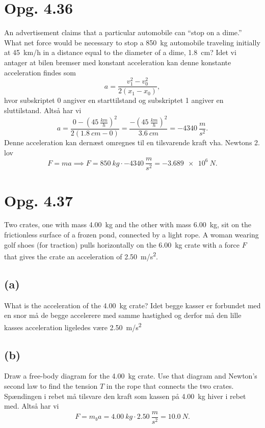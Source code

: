 \documentclass[12pt]{article}
\begin{document}
\section*{Opg. 4.36}
An advertisement claims that a particular automobile can ``stop on a dime.'' What net force would be necessary to stop a \qty{850}{kg} automobile traveling initially at \qty{45}{km/h} in a distance equal to the diameter of a dime, \qty{1,8}{cm}?
\bigbreak
Idet vi antager at bilen bremser med konstant acceleration kan denne konstante acceleration findes som
\[
a = \frac{v_1^2-v_0^2}{2\left( x_1 - x_0 \right)}
,\] 
hvor subskriptet 0 angiver en starttilstand og subskriptet 1 angiver en sluttilstand. Altså har vi
\[
a = \frac{0-(\qty{45}{\frac{km}{h}})^2}{2\left( \qty{1,8}{cm}-0 \right) } = \frac{-(\qty{45}{\frac{km}{h}})^2}{\qty{3,6}{cm}} = \qty{-4340}{\frac{m}{s^2}}
.\] 
Denne acceleration kan dernæst omregnes til en tilsvarende kraft vha. Newtons 2. lov
\[
F = ma \implies F = \qty{850}{kg}\cdot \qty{-4340}{\frac{m}{s^2}} = \qty{-3,689e6}{N}
.\] 

\section*{Opg. 4.37}
Two crates, one with mass \qty{4,00}{kg} and the other with mass \qty{6,00}{\kg}, sit on the frictionless surface of a frozen pond, connected by a light rope. A woman wearing golf shoes (for traction) pulls horizontally on the \qty{6,00}{\kg} crate with a force $F$ that gives the crate an acceleration of \qty{2,50}{m/s^2}.


\subsection*{(a)}
What is the acceleration of the \qty{4,00}{kg} crate?
\bigbreak
Idet begge kasser er forbundet med en snor må de begge accelerere med samme hastighed og derfor må den lille kasses acceleration ligeledes være \qty{2,50}{m/s^2}

\subsection*{(b)}
Draw a free-body diagram for the \qty{4,00}{kg} crate. Use that diagram and Newton’s second law to find the tension $T$ in the rope that connects the two crates.
\bigbreak
Spændingen i rebet må tilsvare den kraft som kassen på \qty{4,00}{kg} hiver i rebet med. Altså har vi
\[
F = m_b a = \qty{4,00}{kg}\cdot \qty{2,50}{\frac{m}{s^2}} = \qty{10,0}{N}
.\] 
\end{document}
